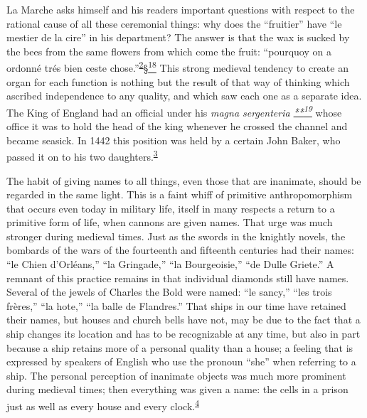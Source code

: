 La Marche asks himself and his readers important questions with respect
to the rational cause of all these ceremonial things: why does the
``fruitier'' have ``le mestier de la cire'' in his department? The
answer is that the wax is sucked by the bees from the same flowers from
which come the fruit: ``pourquoy on a ordonné trés bien ceste
chose.''\textsuperscript{\protect\hypertarget{18_Chapter_Eleven__THE_FORMS_OF_THO.xhtmlux5cux23id_627}{\protect\hyperlink{23_NOTES.xhtmlux5cux23id_628}{2}}}\protect\hypertarget{18_Chapter_Eleven__THE_FORMS_OF_THO.xhtmlux5cux23id_2339}{\protect\hyperlink{23_NOTES.xhtmlux5cux23id_2340}{§\textsuperscript{18}}}
This strong medieval tendency to create an organ for each function is
nothing but the result of that way of thinking which ascribed
independence to any quality, and which saw each one as a separate idea.
The King of England had an official under his \emph{magna sergenteria
\protect\hypertarget{18_Chapter_Eleven__THE_FORMS_OF_THO.xhtmlux5cux23id_2341}{\protect\hyperlink{23_NOTES.xhtmlux5cux23id_2342}{**\textsuperscript{19}}}}
whose office it was to hold the head of the king whenever he crossed the
channel and became seasick. In 1442 this position was held by a certain
John Baker, who passed it on to his two
daughters.\textsuperscript{\protect\hypertarget{18_Chapter_Eleven__THE_FORMS_OF_THO.xhtmlux5cux23id_625}{\protect\hyperlink{23_NOTES.xhtmlux5cux23id_626}{3}}}

The habit of giving names to all things, even those that are inanimate,
should be regarded in the same light. This is a faint whiff of primitive
anthropomorphism that occurs even today in military life, itself in many
respects a return to a primitive form of life, when cannons are given
names. That urge was much stronger during medieval times. Just as the
swords in the knightly novels, the bombards of the wars of the
fourteenth and fifteenth centuries had their names: ``le Chien
d'Orléans,'' ``la Gringade,'' ``la Bourgeoisie,'' ``de Dulle Griete.'' A
remnant of this practice remains in that individual diamonds still have
names. Several of the jewels of Charles the Bold were named: ``le
sancy,'' ``les trois frères,'' ``la hote,'' ``la balle de Flandres.''
That ships in our time have retained their names, but houses and church
bells have not, may be due to the fact that a ship changes its location
and has to be recognizable
\protect\hypertarget{18_Chapter_Eleven__THE_FORMS_OF_THO.xhtmlux5cux23page_270}{}{}at
any time, but also in part because a ship retains more of a personal
quality than a house; a feeling that is expressed by speakers of English
who use the pronoun ``she'' when referring to a ship. The personal
perception of inanimate objects was much more prominent during medieval
times; then everything was given a name: the cells in a prison just as
well as every house and every
clock.\textsuperscript{\protect\hypertarget{18_Chapter_Eleven__THE_FORMS_OF_THO.xhtmlux5cux23id_623}{\protect\hyperlink{23_NOTES.xhtmlux5cux23id_624}{4}}}

